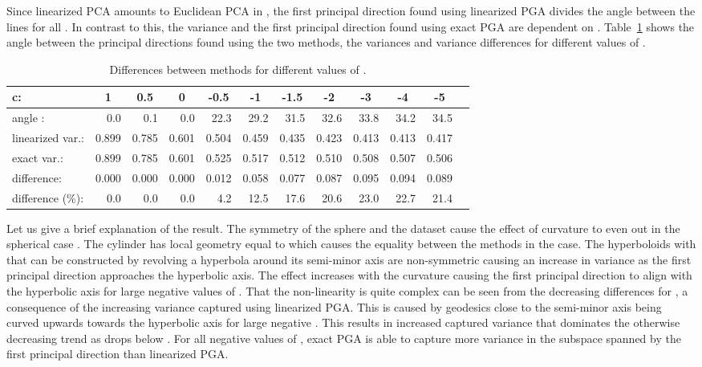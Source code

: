 \documentclass[final]{svjour3}
\begin{document}
Since linearized PCA amounts to Euclidean PCA in , the first principal
direction found using linearized PGA divides the angle between the lines for all . 
In contrast to this, the variance and the
first principal direction found using exact PGA are dependent on .
Table~\ref{table:low1} shows the angle between the principal directions found
using the two methods, the variances and variance differences for different
values of . 
\begin{table}[ht]
    \scriptsize
    \setlength{\tabcolsep}{5pt}
\begin{center}
\begin{tabular}{lrrrrrrrrrrr}
  \hline
  \bf{c}: & 
  \multicolumn{1}{c}{\bf{1}} & 
  \multicolumn{1}{c}{\bf{0.5}} &
  \multicolumn{1}{c}{\bf{0}} &
  \multicolumn{1}{c}{\bf{-0.5}} &
  \multicolumn{1}{c}{\bf{-1}} &
  \multicolumn{1}{c}{\bf{-1.5}} &
  \multicolumn{1}{c}{\bf{-2}} & 
  \multicolumn{1}{c}{\bf{-3}} &
  \multicolumn{1}{c}{\bf{-4}} &
  \multicolumn{1}{c}{\bf{-5}}\\
  \hline
  angle :     & 0.0   & 0.1   & 0.0   & 22.3  & 29.2  & 31.5  & 32.6 & 33.8  & 34.2   & 34.5 \\
  linearized var.:         & 0.899 & 0.785 & 0.601 & 0.504 & 0.459 & 0.435 & 0.423 & 0.413 & 0.413 & 0.417 \\
  exact var.:           & 0.899 & 0.785 & 0.601 & 0.525 & 0.517 & 0.512 & 0.510 & 0.508 & 0.507 & 0.506 \\
  difference:           & 0.000 & 0.000 & 0.000 & 0.012 & 0.058 & 0.077 & 0.087 & 0.095 & 0.094 & 0.089 \\
  difference (\%):      & 0.0   & 0.0   & 0.0   & 4.2   & 12.5  & 17.6  & 20.6 & 23.0  & 22.7   & 21.4 \\
   \hline
\end{tabular}
\caption{Differences between methods for different values of .}
\label{table:low1}
\end{center}
\end{table}

Let us give a brief explanation of the result. The symmetry of the sphere and the
dataset cause the effect of curvature to even out in the spherical case .
The cylinder  has local geometry equal to  which causes the equality
between the methods in the  case. The hyperboloids with  that 
can be constructed by revolving a hyperbola around its semi-minor axis
are non-symmetric causing an increase in variance as the first 
principal direction approaches the
hyperbolic axis. The effect increases with the curvature causing 
the first principal direction to align with the hyperbolic axis for large negative 
values of . That the non-linearity is quite complex can be seen from the
decreasing differences for , a consequence of the increasing variance captured
using linearized PGA. This is caused by geodesics close to the semi-minor axis
being curved upwards towards the hyperbolic axis for large negative . This
results in increased captured variance that dominates the otherwise decreasing trend as  drops
below .
For all negative values of , exact PGA is able to capture 
more variance in the subspace spanned by the first principal direction than
linearized PGA.
\end{document}
